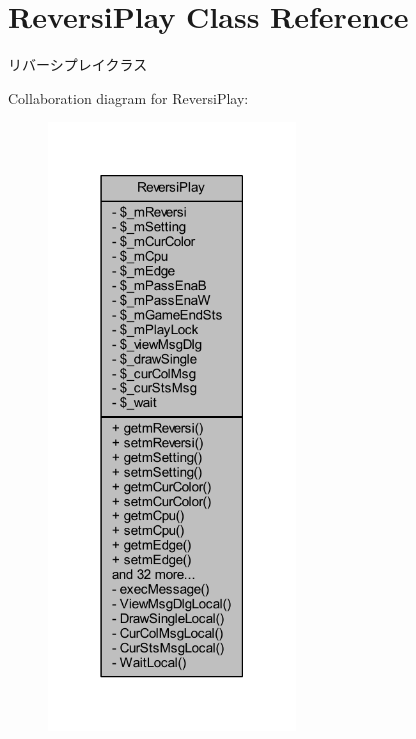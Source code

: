 \hypertarget{class_reversi_play}{}\section{Reversi\+Play Class Reference}
\label{class_reversi_play}


リバーシプレイクラス  




Collaboration diagram for Reversi\+Play\+:\nopagebreak
\begin{figure}[H]
\begin{center}
\leavevmode
\includegraphics[width=186pt]{class_reversi_play__coll__graph}
\end{center}
\end{figure}
